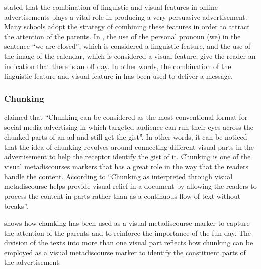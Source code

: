 \documentclass[english]{textolivre}
\begin{document}
\textcite{janoschka_web_2004} stated that the combination of linguistic and visual features in online advertisements plays a vital role in producing a very persuasive advertisement. Many schools adopt the strategy of combining these features in order to attract the attention of the parents. In , the use of the personal pronoun (we) in the sentence “we are closed”, which is considered a linguistic feature, and the use of the image of the calendar, which is considered a visual feature, give the reader an indication that there is an off day. In other words, the combination of the linguistic feature and visual feature in  has been used to deliver a message.

\subsubsection{Chunking}\label{sec-titulo}
\textcite[p.~32]{al-subhi_metadiscourse_2022} claimed that “Chunking can be considered as the most conventional format for social media advertising in which targeted audience can run their eyes across the chunked parts of an ad and still get the gist”. In other words, it can be noticed that the idea of chunking revolves around connecting different visual parts in the advertisement to help the receptor identify the gist of it. Chunking is one of the visual metadiscourses markers that has a great role in the way that the readers handle the content. According to \textcite[p.~419]{kumpf_visual_2000} “Chunking as interpreted through visual metadiscourse helps provide visual relief in a document by allowing the readers to process the content in parts rather than as a continuous flow of text without breaks”.

 shows how chunking has been used as a visual metadiscourse marker to capture the attention of the parents and to reinforce the importance of the fun day. The division of the texts into more than one visual part reflects how chunking can be employed as a visual metadiscourse marker to identify the constituent parts of the advertisement.
\end{document}

